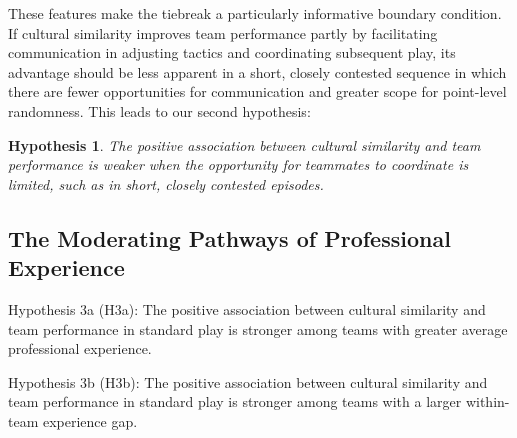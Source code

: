 \documentclass[10pt]{article}
\newtheorem{hypothesis}{Hypothesis}
\begin{document}
 These features make the tiebreak a particularly informative boundary condition. If cultural similarity improves team performance partly by facilitating communication in adjusting tactics and coordinating subsequent play, its advantage should be less apparent in a short, closely contested sequence in which there are fewer opportunities for communication and greater scope for point-level randomness. This leads to our second hypothesis:

\begin{hypothesis}
The positive association between cultural similarity and team performance is weaker when the opportunity for teammates to coordinate is limited, such as in short, closely contested episodes.
\end{hypothesis}

\subsection{The Moderating Pathways of Professional Experience}


Hypothesis 3a (H3a): The positive association between cultural similarity and team performance in standard play is stronger among teams with greater average professional experience.

Hypothesis 3b (H3b): The positive association between cultural similarity and team performance in standard play is stronger among teams with a larger within-team experience gap.
\end{document}
